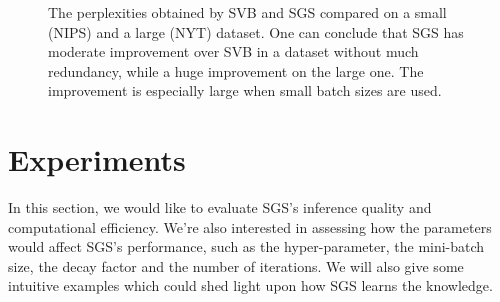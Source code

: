\documentclass{article}
\begin{document}
\begin{figure}[ht]
\vskip 0.2in
\begin{center} 
\centering   
{}    
\caption{ The perplexities obtained by SVB and SGS compared on a small (NIPS) and a large (NYT) dataset. One can conclude that SGS has moderate improvement over SVB in a dataset without much redundancy, while a huge improvement on the large one. The improvement is especially large when small batch sizes are used.}    
\label{fig:batch}    
\end{center}
\vskip -0.2in
\end{figure} 


\section{Experiments}
In this section, we would like to evaluate SGS's inference quality and computational efficiency. We're also interested in assessing how the parameters would affect SGS's performance, such as the hyper-parameter, the mini-batch size, the decay factor and the number of iterations. We will also give some intuitive examples which could shed light upon how SGS learns the knowledge.
\end{document}
